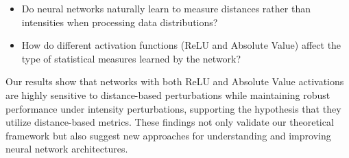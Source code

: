 \begin{itemize}
    \item Do neural networks naturally learn to measure distances rather than intensities when processing data distributions?
    \item How do different activation functions (ReLU and Absolute Value) affect the type of statistical measures learned by the network?
\end{itemize}

Our results show that networks with both ReLU and Absolute Value activations are highly sensitive to distance-based perturbations while maintaining robust performance under intensity perturbations, supporting the hypothesis that they utilize distance-based metrics. These findings not only validate our theoretical framework but also suggest new approaches for understanding and improving neural network architectures.